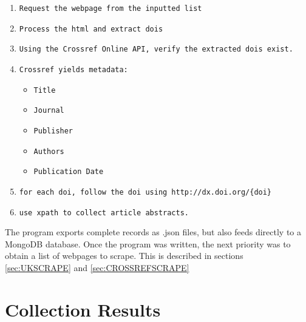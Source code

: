 \begin{sloppypar}
\begin{enumerate}
\item \texttt{Request the webpage from the inputted list}
\item \texttt{Process the html and extract dois}
\item \texttt{Using the Crossref Online API, verify the extracted dois exist.}
\item \texttt{Crossref yields metadata:}
\begin{itemize}
\item \texttt{Title}
\item \texttt{Journal}
\item \texttt{Publisher}
\item \texttt{Authors}
\item \texttt{Publication Date}
\end{itemize}
\item \texttt{for each doi, follow the doi using \texttt{http://dx.doi.org/\{doi\}}}
\item \texttt{use xpath to collect article abstracts.}
\end{enumerate}
\end{sloppypar}
The program exports complete records as .json files, but also feeds directly to a MongoDB database. Once the program was written, the next priority was to obtain a list of webpages to scrape. This is described in sections \ref{sec:UKSCRAPE} and \ref{sec:CROSSREFSCRAPE} 
\section{Collection Results}
